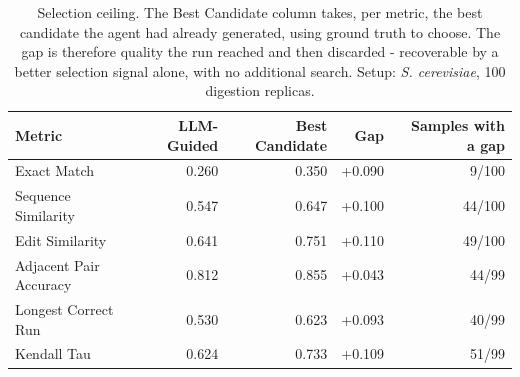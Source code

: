 \begin{table}[!tb]
  \centering
  \caption{Selection ceiling. The Best Candidate column takes, per metric, the best candidate the agent had already generated, using ground truth to choose. The gap is therefore quality the run reached and then discarded - recoverable by a better selection signal alone, with no additional search. Setup: \textnormal{\textnormal{\textit{S. cerevisiae}}}, 100 digestion replicas.}
  \label{tab:selection_ceiling_yeast_r100}
  \begin{tabular}{lrrrr}
    \toprule
    Metric & LLM-Guided & Best Candidate & Gap & Samples with a gap \\
    \midrule
    Exact Match & 0.260 & 0.350 & +0.090 & 9/100 \\
    Sequence Similarity & 0.547 & 0.647 & +0.100 & 44/100 \\
    Edit Similarity & 0.641 & 0.751 & +0.110 & 49/100 \\
    Adjacent Pair Accuracy & 0.812 & 0.855 & +0.043 & 44/99 \\
    Longest Correct Run & 0.530 & 0.623 & +0.093 & 40/99 \\
    Kendall Tau & 0.624 & 0.733 & +0.109 & 51/99 \\
    \bottomrule
  \end{tabular}
\end{table}
